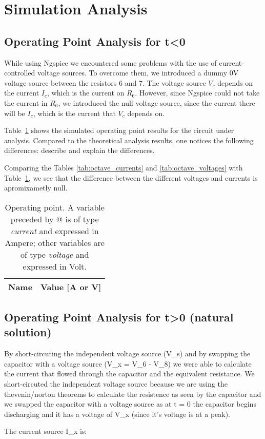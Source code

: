\section{Simulation Analysis}
\label{sec:simulation}
\tab

\subsection{Operating Point Analysis for t<0}
\label{subsec:op_analysis}

\tab While using Ngspice we encountered some problems with the use of current-controlled voltage sources. To overcome them, we introduced a dummy 0V voltage source between the resistors 6 and 7.
The voltage source $V_c$ depends on the current $I_c$, which is the current on $R_6$. However, since Ngspice could not take the current in $R_6$, we introduced the null voltage source, since the current there will be $I_c$, which is the current that $V_c$ depends on.

Table~\ref{tab:op} shows the simulated operating point results for the circuit
under analysis. Compared to the theoretical analysis results, one notices the
following differences: describe and explain the differences.

Comparing the Tables \ref{tab:octave_currents} and \ref{tab:octave_voltages} with Table~\ref{tab:op}, we see that the difference between the different voltages and currents is apromixametly null.\par
\begin{table}[h]
  \centering
  \begin{tabular}{|l|r|}
    \hline    
    {\bf Name} & {\bf Value [A or V]} \\ \hline
    
  \end{tabular}
  \caption{Operating point. A variable preceded by @ is of type {\em current}
    and expressed in Ampere; other variables are of type {\it voltage} and expressed in
    Volt.}
  \label{tab:op}
\end{table}

\par
\subsection{Operating Point Analysis for t>0 (natural solution)}
By short-circuting the independent voltage source (V_s) and by swapping the capacitor with a voltage source (V_x = V_6 - V_8) we were able to calculate the current that flowed through the capacitor and the equivalent resistance. We short-circuted the independent voltage source because we are using the thevenin/norton theorems to calculate the resistence as seen by the capacitor and we swapped the capacitor with a voltage source as at t = 0 the capacitor begins discharging and it has a voltage of V_x (since it's voltage is at a peak).\par
The current source I_x is:

